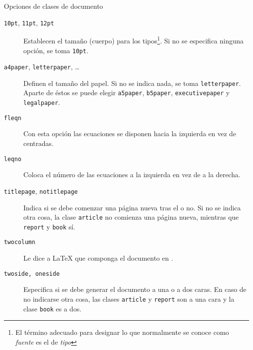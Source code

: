 \begin{table}[!bp]
\caption{Opciones de clases de documento} \label{options}
\begin{lined}{12cm}
\begin{flushleft}
\begin{description}

\item[\normalfont\texttt{10pt},  \texttt{11pt},  \texttt{12pt}]  \quad
Establecen  el  tamaño  (cuerpo) para  los  tipos\footnote{El  término
adecuado para designar lo que normalmente se conoce como \emph{fuente}
es el  de \emph{tipo}}. Si  no se  especifica ninguna opción,  se toma
\texttt{10pt}.

\item[\normalfont\texttt{a4paper},    \texttt{letterpaper},    \ldots]
\quad  Definen  el  tamaño  del  papel.  Si  no  se  indica  nada,  se
toma   \texttt{letterpaper}.  Aparte   de   éstos   se  puede   elegir
\texttt{a5paper},    \texttt{b5paper},    \texttt{executivepaper}    y
\texttt{legalpaper}.           \  

\item[\normalfont\texttt{fleqn}] \quad Con  esta opción las ecuaciones
se disponen hacia la izquierda en vez de centradas.

\item[\normalfont\texttt{leqno}]  \quad   Coloca  el  número   de  las
ecuaciones a la izquierda en vez de a la derecha.

\item[\normalfont\texttt{titlepage},    \texttt{notitlepage}]    \quad
Indica si  se debe comenzar  una página  nueva tras el   o no. Si no se  indica otra cosa, la clase \texttt{article}
no  comienza   una  página  nueva,  mientras   que  \texttt{report}  y
\texttt{book} sí.

\item[\normalfont\texttt{twocolumn}]  \quad  Le  dice a  \LaTeX{}  que
componga el documento en .

\item[\normalfont\texttt{twoside,  oneside}]  \quad Especifica  si  se
debe generar el documento a una o a dos caras. En caso de no indicarse
otra cosa,  las clases  \texttt{article} y  \texttt{report} son  a una
cara y la clase \texttt{book} es a dos.


\end{description}
\end{flushleft}
\end{lined}
\end{table}
